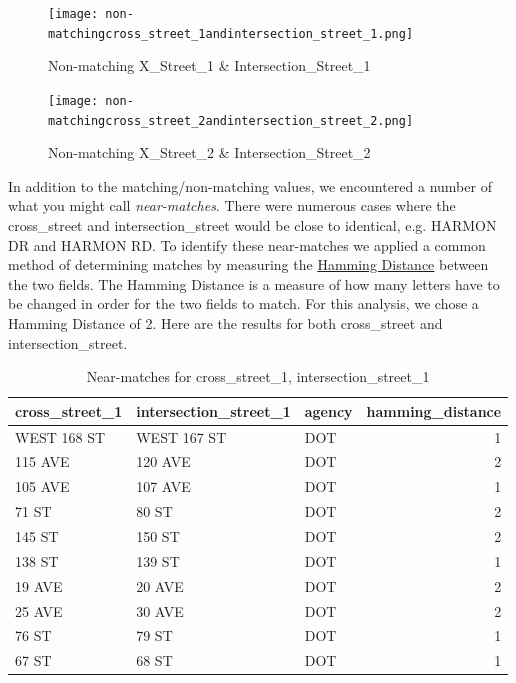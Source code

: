 \documentclass[12pt, titlepage]{article}
\begin{document}
{	\begin{figure}[H]
		 \centering
		 \texttt{[image: non-matchingcross\_street\_1andintersection\_street\_1.png]}
		 \caption{Non-matching X\_Street\_1 \& Intersection\_Street\_1}
		 \label{fig:xstreet1}
	\end{figure}	

	\begin{figure}[H]
		 \centering
		 \texttt{[image: non-matchingcross\_street\_2andintersection\_street\_2.png]}
		 \caption{Non-matching X\_Street\_2 \& Intersection\_Street\_2}
		 \label{fig:xstreet2}
	\end{figure}	

In addition to the matching/non-matching values, we encountered a number of what you might call
\emph{near-matches}. There were numerous cases where the cross\_street and intersection\_street
would be close to identical, e.g. HARMON DR and HARMON RD. To identify these near-matches
we applied a common method of determining matches by measuring 
the \href{https://en.wikipedia.org/wiki/Hamming_distance}{Hamming Distance} between
the two fields. The Hamming Distance is a measure of how many letters have to be changed
in order for the two fields to match. For this analysis, we chose a Hamming Distance of 2.
Here are the results for both cross\_street and intersection\_street.

\begin{table}[H]
    \centering
    \footnotesize
    \begin{tabular}{l l l r}
        \toprule
        \textbf{cross\_street\_1} & \textbf{intersection\_street\_1} & \textbf{agency} & \textbf{hamming\_distance} \\
        \midrule
        WEST 168 ST    & WEST 167 ST           & DOT    & 1 \\
        115 AVE        & 120 AVE               & DOT    & 2 \\
        105 AVE        & 107 AVE               & DOT    & 1 \\
        71 ST          & 80 ST                 & DOT    & 2 \\
        145 ST         & 150 ST                & DOT    & 2 \\
        138 ST         & 139 ST                & DOT    & 1 \\
        19 AVE         & 20 AVE                & DOT    & 2 \\
        25 AVE         & 30 AVE                & DOT    & 2 \\
        76 ST          & 79 ST                 & DOT    & 1 \\
        67 ST          & 68 ST                 & DOT    & 1 \\
        \bottomrule
    \end{tabular}
    \caption{Near-matches for cross\_street\_1, intersection\_street\_1}
    \label{tab:x1nearmatches}
\end{table}

}
\end{document}
